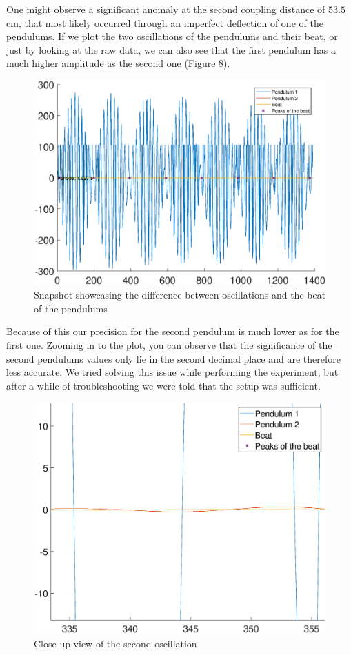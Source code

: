 \documentclass{article}
\begin{document}
One might observe a significant anomaly at the second coupling distance of $53.5$ cm, that most likely occurred through an imperfect deflection of one of the pendulums.
If we plot the two oscillations of the pendulums and their beat, or just by looking at the raw data, we can also see that the first pendulum has a much higher amplitude as the second one (Figure 8). 
\begin{figure}[hbt!]
\centering
\includegraphics[width=400pt]{precision.eps}
\caption{Snapshot showcasing the difference between oscillations and the beat of the pendulums}
\end{figure}
Because of this our precision for the second pendulum is much lower as for the first one. Zooming in to the plot, you can observe that the significance of the second pendulums values only lie in the second decimal place and are therefore less accurate. We tried solving this issue while performing the experiment, but after a while of troubleshooting we were told that the setup was sufficient.
\begin{figure}[hbt!]
\centering
\includegraphics[width=400pt]{closeup.eps}
\caption{Close up view of the second oscillation}
\end{figure}
\end{document}
